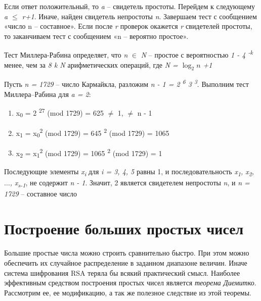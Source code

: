  Если ответ положительный, то \textit{a} – свидетель простоты. Перейдем к следующему \textit{a {$\leq$} r+1}. Иначе, найден свидетель 
непростоты \textit{n}. Завершаем тест с сообщением «число n – составное». Если после \textit{r} проверок окажется \textit{r} свидетелей
простоты, то заканчиваем тест с сообщением «n – вероятно простое».

  \begin{statement}

      Тест Миллера-Рабина определяет, что \textit{n} {$\in$} \textit{N} – простое с вероятностью
    \textit{1 - 4\textsuperscript{ -k}} менее, чем за \textit{8 k N} арифметических операций, где \textit{N = {$\log_{2}{n}$} +1 }
    
  \end{statement}

  \begin{example}    
  
      Пусть \textit{n = 1729} – число Кармайкла, разложим \textit{n - 1 = 2\textsuperscript{ 6} 3\textsuperscript{ 3}}. 
    Выполним тест Миллера–Рабина для \textit{a = 2}:
    
    \begin{enumerate}
    \item x\textsubscript{0} = 2\textsuperscript{ 27} (mod 1729) = 625 {$\ne$} 1, {$\ne$} n - 1
    \item x\textsubscript{1} = x\textsubscript{0}\textsuperscript{2} (mod 1729) = 645\textsuperscript{ 2} (mod 1729) = 1065
    \item x\textsubscript{2} = x\textsubscript{1}\textsuperscript{2} (mod 1729) = 1065\textsuperscript{ 2} (mod 1729) = 1
    \end{enumerate}
    
    Последующие элементы \textit{{x\textsubscript{i}}} для \textit{i = 3, 4, 5} равны 1, и последовательность 
  \textit{{x\textsubscript{1}, x\textsubscript{2}, {$\dots$}, x\textsubscript{s-1}}}, 
  не содержит \textit{n - 1}. Значит, 2 является свидетелем непростоты \textit{n}, и \textit{n = 1729} – составное число
  
  \end{example}

\section{Построение больших простых чисел}

\paragraph{} Большие простые числа можно строить сравнительно быстро. При этом можно обеспечить их случайное распределение в 
заданном диапазоне величин. Иначе система шифрования RSA теряла бы всякий практический смысл. Наиболее эффективным средством 
построения простых чисел является \textit{теорема Диемитко}. Рассмотрим ее, ее модификацию, а так же полезное следствие из этой теоремы.

